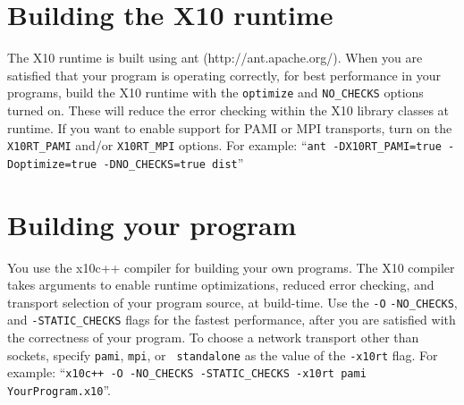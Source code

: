 \section{Building the X10 runtime}
The X10 runtime is built using ant (http://ant.apache.org/).  When you
are satisfied that your program is operating correctly, for best performance in
your programs, build the X10 runtime with the {\tt optimize} and
{\tt NO\_CHECKS} options turned on.  These will reduce the error checking within
the X10 library classes at runtime.  If you want to enable support for PAMI or
MPI transports, turn on the {\tt X10RT\_PAMI} and/or {\tt X10RT\_MPI} options. 
For example: ``{\tt ant -DX10RT\_PAMI=true -Doptimize=true -DNO\_CHECKS=true
dist}''

\section{Building your program}
You use the x10c++ compiler for building your own programs.  The X10 compiler
takes arguments to enable runtime optimizations, reduced error checking, and
transport selection of your program source, at build-time.  Use the {\tt -O}
{\tt -NO\_CHECKS}, and {\tt -STATIC\_CHECKS} flags for the fastest performance,
after you are satisfied with the correctness of your program.  To choose a
network transport other than sockets, specify {\tt pami}, {\tt mpi}, or {\tt
standalone} as the value of the {\tt -x10rt} flag.  For example: 
``{\tt x10c++ -O -NO\_CHECKS -STATIC\_CHECKS -x10rt pami YourProgram.x10}''.
